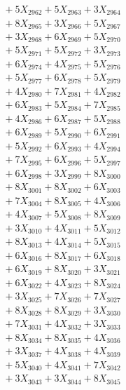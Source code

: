 \documentclass[a4paper,10pt]{article}
\begin{document}
{\begin{align}
&\;  + 5 X_{2962} + 5 X_{2963} + 3 X_{2964} \\[0.3ex]
&\;  + 8 X_{2965} + 3 X_{2966} + 5 X_{2967} \\[0.3ex]
&\;  + 3 X_{2968} + 6 X_{2969} + 5 X_{2970} \\[0.3ex]
&\;  + 5 X_{2971} + 5 X_{2972} + 3 X_{2973} \\[0.3ex]
&\;  + 6 X_{2974} + 4 X_{2975} + 5 X_{2976} \\[0.3ex]
&\;  + 5 X_{2977} + 6 X_{2978} + 5 X_{2979} \\[0.5ex]\allowbreak
&\;  + 4 X_{2980} + 7 X_{2981} + 4 X_{2982} \\[0.3ex]
&\;  + 6 X_{2983} + 5 X_{2984} + 7 X_{2985} \\[0.3ex]
&\;  + 4 X_{2986} + 6 X_{2987} + 5 X_{2988} \\[0.3ex]
&\;  + 6 X_{2989} + 5 X_{2990} + 6 X_{2991} \\[0.3ex]
&\;  + 5 X_{2992} + 6 X_{2993} + 4 X_{2994} \\[0.3ex]
&\;  + 7 X_{2995} + 6 X_{2996} + 5 X_{2997} \\[0.3ex]
&\;  + 6 X_{2998} + 3 X_{2999} + 8 X_{3000} \\[0.3ex]
&\;  + 8 X_{3001} + 8 X_{3002} + 6 X_{3003} \\[0.3ex]
&\;  + 7 X_{3004} + 8 X_{3005} + 4 X_{3006} \\[0.3ex]
&\;  + 4 X_{3007} + 5 X_{3008} + 8 X_{3009} \\[0.5ex]\allowbreak
&\;  + 3 X_{3010} + 4 X_{3011} + 5 X_{3012} \\[0.3ex]
&\;  + 8 X_{3013} + 4 X_{3014} + 5 X_{3015} \\[0.3ex]
&\;  + 6 X_{3016} + 8 X_{3017} + 6 X_{3018} \\[0.3ex]
&\;  + 6 X_{3019} + 8 X_{3020} + 3 X_{3021} \\[0.3ex]
&\;  + 6 X_{3022} + 4 X_{3023} + 8 X_{3024} \\[0.3ex]
&\;  + 3 X_{3025} + 7 X_{3026} + 7 X_{3027} \\[0.3ex]
&\;  + 8 X_{3028} + 8 X_{3029} + 3 X_{3030} \\[0.3ex]
&\;  + 7 X_{3031} + 4 X_{3032} + 3 X_{3033} \\[0.3ex]
&\;  + 8 X_{3034} + 8 X_{3035} + 4 X_{3036} \\[0.3ex]
&\;  + 3 X_{3037} + 4 X_{3038} + 4 X_{3039} \\[0.5ex]\allowbreak
&\;  + 5 X_{3040} + 4 X_{3041} + 7 X_{3042} \\[0.3ex]
&\;  + 3 X_{3043} + 3 X_{3044} + 8 X_{3045} \\[0.3ex]

\end{align}}
\end{document}
